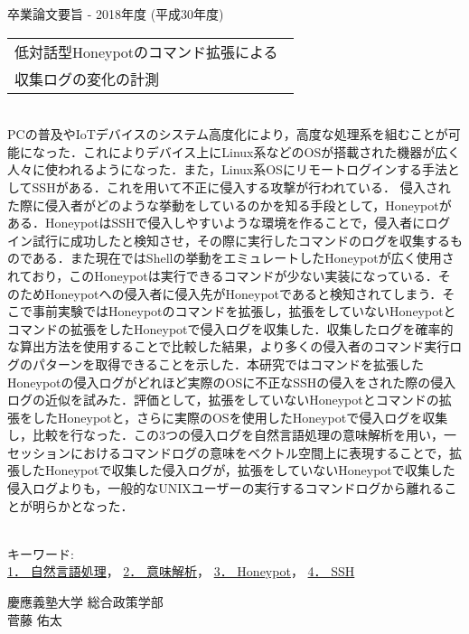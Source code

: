 卒業論文要旨 - 2018年度 (平成30年度)
\begin{center}
\begin{large}
\begin{tabular}{|M{0.97\linewidth}|}
    \hline
   低対話型Honeypotのコマンド拡張による\\収集ログの変化の計測\\
    \hline
\end{tabular}
\end{large}
\end{center}

~ \\

PCの普及やIoTデバイスのシステム高度化により，高度な処理系を組むことが可能になった．これによりデバイス上にLinux系などのOSが搭載された機器が広く人々に使われるようになった．また，Linux系OSにリモートログインする手法としてSSHがある．これを用いて不正に侵入する攻撃が行われている．
侵入された際に侵入者がどのような挙動をしているのかを知る手段として，Honeypotがある．HoneypotはSSHで侵入しやすいような環境を作ることで，侵入者にログイン試行に成功したと検知させ，その際に実行したコマンドのログを収集するものである．また現在ではShellの挙動をエミュレートしたHoneypotが広く使用されており，このHoneypotは実行できるコマンドが少ない実装になっている．そのためHoneypotへの侵入者に侵入先がHoneypotであると検知されてしまう．そこで事前実験ではHoneypotのコマンドを拡張し，拡張をしていないHoneypotとコマンドの拡張をしたHoneypotで侵入ログを収集した．収集したログを確率的な算出方法を使用することで比較した結果，より多くの侵入者のコマンド実行ログのパターンを取得できることを示した．本研究ではコマンドを拡張したHoneypotの侵入ログがどれほど実際のOSに不正なSSHの侵入をされた際の侵入ログの近似を試みた．評価として，拡張をしていないHoneypotとコマンドの拡張をしたHoneypotと，さらに実際のOSを使用したHoneypotで侵入ログを収集し，比較を行なった．この3つの侵入ログを自然言語処理の意味解析を用い，一セッションにおけるコマンドログの意味をベクトル空間上に表現することで，拡張したHoneypotで収集した侵入ログが，拡張をしていないHoneypotで収集した侵入ログよりも，一般的なUNIXユーザーの実行するコマンドログから離れることが明らかとなった．


~ \\
キーワード:\\
\underline{1． 自然言語処理}，
\underline{2． 意味解析}，
\underline{3． Honeypot}，
\underline{4． SSH}
\begin{flushright}
慶應義塾大学 総合政策学部\\
菅藤 佑太
\end{flushright}
